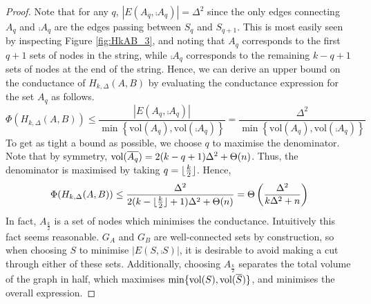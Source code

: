 \begin{proof}
	Note that for any $q$, $|E(A_q,\comp{A_q})| = \Delta^2$ since the only edges connecting $A_q$ and $\comp{A_q}$ are the edges passing between $S_q$ and $S_{q+1}$. This is most easily seen by inspecting Figure \ref{fig:HkAB_3}, and noting that $A_q$ corresponds to the first $q + 1$ sets of nodes in the string, while $\comp{A_q}$ corresponds to the remaining $k - q + 1$ sets of nodes at the end of the string.
	Hence, we can derive an upper bound on the conductance of $H_{k, \Delta}(A, B)$ by evaluating the conductance expression for the set $A_q$ as follows.
	$$
		\Phi(H_{k, \Delta}(A, B)) 
		\leq \frac{|E(A_q, \comp{A_q})|}{\min \left\{ \text{vol}(A_q), \text{vol}(\comp{A_q}) \right\} } 
		= \frac{\Delta^2}{\min \left\{ \text{vol}(A_q), \text{vol}(\comp{A_q}) \right\}}
	$$	
	To get as tight a bound as possible, we choose $q$ to maximise the denominator. Note that by symmetry, $\text{vol}(\overline{A_q}) = 2(k - q + 1)\Delta^2 + \Theta(n)$. Thus, the denominator is maximised by taking $q = \lfloor\frac{k}{2}\rfloor$. Hence,
	$$
		\Phi(H_{k, \Delta}(A, B)) 
		\leq \frac{\Delta^2}{2(k - \lfloor\frac{k}{2}\rfloor + 1)\Delta^2 + \Theta(n)}
		= \Theta\left(\frac{\Delta^2}{k\Delta^2 + n}\right)
	$$
	In fact, $A_\frac{k}{2}$ is a set of nodes which minimises the conductance. Intuitively this fact seems reasonable. $G_A$ and $G_B$ are well-connected sets by construction, so when choosing $S$ to minimise $|E(S, \comp{S})|$, it is desirable to avoid making a cut through either of these sets. Additionally, choosing $A_\frac{k}{2}$ separates the total volume of the graph in half, which maximises $\min \{\text{vol}(S),\text{vol}(\overline{S})\}$, and minimises the overall expression. 
	

\end{proof}
